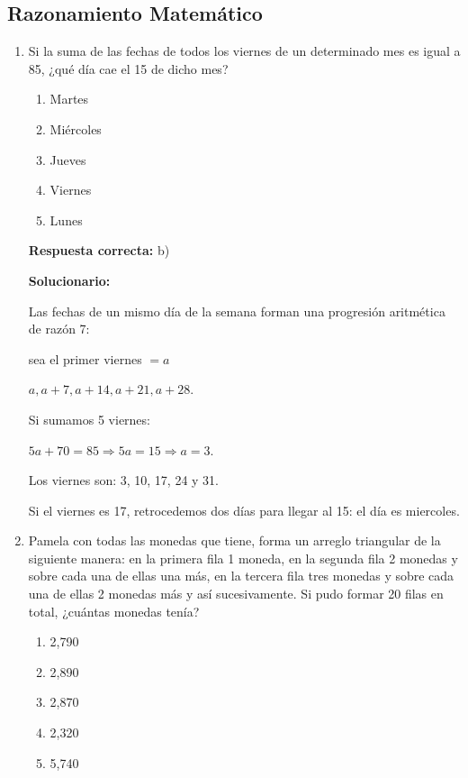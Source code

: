 \subsection*{Razonamiento Matemático}

\begin{enumerate}[resume]



\item Si la suma de las fechas de todos los viernes de un determinado mes es igual a 85, ¿qué día cae el 15 de dicho mes?

\begin{enumerate}[label=\alph*)]
	\item Martes
	\item Miércoles
	\item Jueves
	\item Viernes
	\item Lunes
\end{enumerate}

\textbf{Respuesta correcta:} b)

\vspace{2mm}
\textbf{Solucionario:}

Las fechas de un mismo día de la semana forman una progresión aritmética de razón 7:

sea el primer viernes $= a$

 $a, a+7, a+14, a+21, a+28$.

Si sumamos 5 viernes:

$5a + 70 = 85 \Rightarrow 5a = 15 \Rightarrow a = 3$.

Los viernes son: 3, 10, 17, 24 y 31.

Si el viernes es 17, retrocedemos dos días para llegar al 15: el día es miercoles.

\vspace{6mm}

\item Pamela con todas las monedas que tiene, forma un arreglo triangular de la siguiente manera: en la primera fila 1 moneda, en la segunda fila 2 monedas y sobre cada una de ellas una más, en la tercera fila tres monedas y sobre cada una de ellas 2 monedas más y así sucesivamente. Si pudo formar 20 filas en total, ¿cuántas monedas tenía?

\begin{enumerate}[label=\alph*)]
	\item 2,790
	\item 2,890
	\item 2,870
	\item 2,320
	\item 5,740
\end{enumerate}


\end{enumerate}
